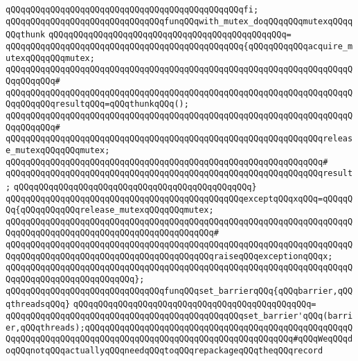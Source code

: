 \verb|qQQqqQQqqQQqqQQqqQQqqQQqqQQqqQQqqQQqqQQqqQQqqQQqfi;|\newline
\newline
\verb|qQQqqQQqqQQqqQQqqQQqqQQqqQQqqQQqfunqQQqwith_mutex_doqQQqqQQqmutexqQQqqQQqthunk|\newline
\verb|qQQqqQQqqQQqqQQqqQQqqQQqqQQqqQQqqQQqqQQqqQQqqQQq=|\newline
\verb|qQQqqQQqqQQqqQQqqQQqqQQqqQQqqQQqqQQqqQQqqQQqqQQq{qQQqqQQqqQQqacquire_mutexqQQqqQQqmutex;|\newline
\verb|qQQqqQQqqQQqqQQqqQQqqQQqqQQqqQQqqQQqqQQqqQQqqQQqqQQqqQQqqQQqqQQqqQQqqQQqqQQqqQQq#|\newline
\verb|qQQqqQQqqQQqqQQqqQQqqQQqqQQqqQQqqQQqqQQqqQQqqQQqqQQqqQQqqQQqqQQqqQQqqQQqqQQqqQQqresultqQQq=qQQqthunkqQQq();|\newline
\verb|qQQqqQQqqQQqqQQqqQQqqQQqqQQqqQQqqQQqqQQqqQQqqQQqqQQqqQQqqQQqqQQqqQQqqQQqqQQqqQQq#|\newline
\verb|qQQqqQQqqQQqqQQqqQQqqQQqqQQqqQQqqQQqqQQqqQQqqQQqqQQqqQQqqQQqqQQqrelease_mutexqQQqqQQqmutex;|\newline
\verb|qQQqqQQqqQQqqQQqqQQqqQQqqQQqqQQqqQQqqQQqqQQqqQQqqQQqqQQqqQQqqQQq#|\newline
\verb|qQQqqQQqqQQqqQQqqQQqqQQqqQQqqQQqqQQqqQQqqQQqqQQqqQQqqQQqqQQqqQQqresult;|\newline
\verb|qQQqqQQqqQQqqQQqqQQqqQQqqQQqqQQqqQQqqQQqqQQqqQQq}|\newline
\verb|qQQqqQQqqQQqqQQqqQQqqQQqqQQqqQQqqQQqqQQqqQQqqQQqexceptqQQqxqQQq=qQQqqQQq{qQQqqQQqqQQqrelease_mutexqQQqqQQqmutex;|\newline
\verb|qQQqqQQqqQQqqQQqqQQqqQQqqQQqqQQqqQQqqQQqqQQqqQQqqQQqqQQqqQQqqQQqqQQqqQQqqQQqqQQqqQQqqQQqqQQqqQQqqQQqqQQqqQQqqQQq#|\newline
\verb|qQQqqQQqqQQqqQQqqQQqqQQqqQQqqQQqqQQqqQQqqQQqqQQqqQQqqQQqqQQqqQQqqQQqqQQqqQQqqQQqqQQqqQQqqQQqqQQqqQQqqQQqqQQqqQQqraiseqQQqexceptionqQQqx;|\newline
\verb|qQQqqQQqqQQqqQQqqQQqqQQqqQQqqQQqqQQqqQQqqQQqqQQqqQQqqQQqqQQqqQQqqQQqqQQqqQQqqQQqqQQqqQQqqQQqqQQq};|\newline
\newline
\verb|qQQqqQQqqQQqqQQqqQQqqQQqqQQqqQQqfunqQQqset_barrierqQQq{qQQqbarrier,qQQqthreadsqQQq}|\newline
\verb|qQQqqQQqqQQqqQQqqQQqqQQqqQQqqQQqqQQqqQQqqQQqqQQq=|\newline
\verb|qQQqqQQqqQQqqQQqqQQqqQQqqQQqqQQqqQQqqQQqqQQqqQQqset_barrier'qQQq(barrier,qQQqthreads);qQQqqQQqqQQqqQQqqQQqqQQqqQQqqQQqqQQqqQQqqQQqqQQqqQQqqQQqqQQqqQQqqQQqqQQqqQQqqQQqqQQqqQQqqQQqqQQqqQQqqQQqqQQqqQQq#qQQqWeqQQqdoqQQqnotqQQqactuallyqQQqneedqQQqtoqQQqrepackageqQQqtheqQQqrecord|\newline
